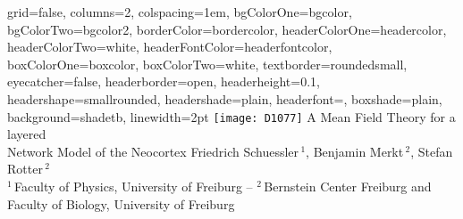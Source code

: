 \documentclass[portrait, final, a0paper, fontscale=0.34]{baposter}
\begin{document}
\newlength{\leftimgwidth}
\begin{poster}%
  {
  grid=false,
  columns=2,
  colspacing=1em,
  bgColorOne=bgcolor,
  bgColorTwo=bgcolor2,
  borderColor=bordercolor,
  headerColorOne=headercolor,
  headerColorTwo=white, %
  headerFontColor=headerfontcolor,
  boxColorOne=boxcolor,
  boxColorTwo=white,    %
  textborder=roundedsmall,
  eyecatcher=false,
  headerborder=open, 
  headerheight=0.1\textheight,
  headershape=smallrounded,
  headershade=plain,
  headerfont=\Large\textsf, %
  boxshade=plain,
  background=shadetb,
  linewidth=2pt
  }
  {\texttt{[image: D1077]}} %
  {\sf %
      A Mean Field Theory for a layered \\ Network Model of the Neocortex
\vspace{0.3em}}
  {\sf %
      \vspace{0em}\Large{Friedrich Schuessler\,$^{1}$, Benjamin Merkt\,$^{2}$, Stefan Rotter\,$^{2}$\\
  \normalsize
  $^1$\,Faculty of Physics, University of Freiburg -- 
  $^2$\,Bernstein Center Freiburg and Faculty of Biology, University of Freiburg 
  }
  }
  {%
  }




\end{poster}
\end{document}
